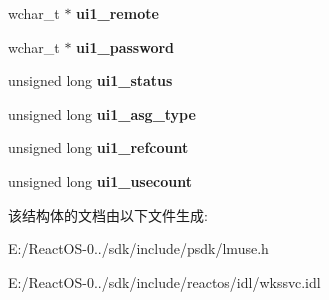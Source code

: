 \begin{DoxyCompactItemize}
\mbox{\label{struct___u_s_e___i_n_f_o__1_a664737e7d472d0f50a5a3c75f2eb9cf5}} 
wchar\+\_\+t $\ast$ {\bfseries ui1\+\_\+remote}
\item 
\mbox{\label{struct___u_s_e___i_n_f_o__1_a652b99a002f41678cdc746fc6e7a8a19}} 
wchar\+\_\+t $\ast$ {\bfseries ui1\+\_\+password}
\item 
\mbox{\label{struct___u_s_e___i_n_f_o__1_afe9adae25838c1f3ebf26c5b3def04eb}} 
unsigned long {\bfseries ui1\+\_\+status}
\item 
\mbox{\label{struct___u_s_e___i_n_f_o__1_a383c4a4dc273cfd6b3c340df251a07ea}} 
unsigned long {\bfseries ui1\+\_\+asg\+\_\+type}
\item 
\mbox{\label{struct___u_s_e___i_n_f_o__1_acdc47377441d25178ce250d8b538fcdc}} 
unsigned long {\bfseries ui1\+\_\+refcount}
\item 
\mbox{\label{struct___u_s_e___i_n_f_o__1_a94dc9fa72e3f56f089bdcc22314d9a93}} 
unsigned long {\bfseries ui1\+\_\+usecount}
\end{DoxyCompactItemize}


该结构体的文档由以下文件生成\+:\begin{DoxyCompactItemize}
\item 
E\+:/\+React\+O\+S-\/0../sdk/include/psdk/lmuse.\+h\item 
E\+:/\+React\+O\+S-\/0../sdk/include/reactos/idl/wkssvc.\+idl\end{DoxyCompactItemize}
